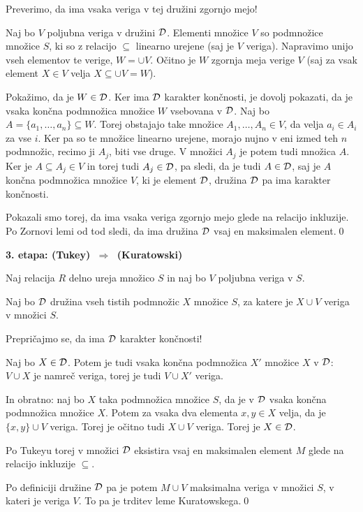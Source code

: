 \documentclass[11pt,paper=b5,footinclude,headinclude]{scrbook} %
\def\sledi {{~\Rightarrow~}}
\begin{document}
Preverimo, da ima vsaka veriga v tej družini zgornjo mejo!

Naj bo $V$ poljubna veriga v družini ${\cal D}$. Elementi množice $V$ so podmnožice množice $S$, ki so z relacijo $\subseteq$ linearno urejene (saj je $V$ veriga).
Napravimo unijo vseh elementov te verige, $W = \cup V$. Očitno je $W$ zgornja meja verige $V$ (saj za vsak element $X\in V$ velja $X\subseteq \cup V = W$).

Pokažimo, da je $W\in{\cal D}$. Ker ima ${\cal D}$ karakter končnosti, je dovolj pokazati, da je vsaka končna podmnožica množice $W$ vsebovana v ${\cal D}$.
Naj bo $A=\{a_1,\ldots, a_n\}\subseteq W$. Torej obstajajo take množice $A_1,\ldots, A_n\in V$, da velja $a_i\in A_i$ za vse $i$. Ker pa so te množice linearno urejene, morajo nujno v eni izmed teh $n$ podmnožic, recimo ji $A_j$, biti vse druge. V množici $A_j$ je potem tudi množica $A$. Ker je $A\subseteq A_j\in V$ in torej tudi $A_j\in {\cal D}$, pa sledi, da je tudi $A\in {\cal D}$, saj je $A$ končna podmnožica množice $V$,
ki je element ${\cal D}$, družina ${\cal D}$ pa ima karakter končnosti.

Pokazali smo torej, da ima vsaka veriga zgornjo mejo glede na relacijo inkluzije.
Po Zornovi lemi od tod sledi, da ima družina ${\cal D}$ vsaj en maksimalen element.\qed

\bigskip
\textbf{3. etapa: (Tukey) $\sledi$ (Kuratowski)}

Naj relacija $R$ delno ureja množico $S$ in naj bo $V$ poljubna veriga v $S$.

Naj bo ${\cal D}$ družina vseh tistih podmnožic $X$ množice $S$, za katere je
$X\cup V$ veriga v množici $S$.

Prepričajmo se, da ima ${\cal D}$ karakter končnosti!

Naj bo $X\in {\cal D}$. Potem je tudi vsaka končna podmnožica $X'$ množice $X$ v ${\cal D}$: $V\cup X$ je namreč veriga, torej je tudi $V\cup X'$ veriga.

In obratno: naj bo $X$ taka podmnožica množice $S$, da je v ${\cal D}$ vsaka končna podmnožica množice $X$. Potem za vsaka dva elementa $x,y\in X$ velja, da je
$\{x,y\}\cup V$ veriga. Torej je očitno tudi $X\cup V$ veriga. Torej je $X\in {\cal D}$.

Po Tukeyu torej v množici ${\cal D}$ eksistira vsaj en maksimalen element $M$ glede na relacijo inkluzije $\subseteq$.

Po definiciji družine ${\cal D}$ pa je potem $M\cup V$ maksimalna veriga v množici $S$, v kateri je veriga $V$. To pa je trditev leme Kuratowskega.\qed
\end{document}
